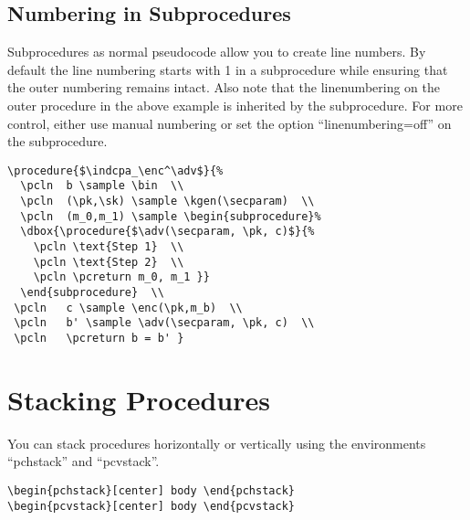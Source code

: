 \documentclass[a4paper]{report}
\begin{document}
\subsection{Numbering in Subprocedures}
Subprocedures as normal pseudocode allow you to create line numbers. By default the line numbering starts with 1 in a subprocedure while
ensuring that the outer numbering remains intact. Also note that the linenumbering on the outer procedure in the above example is inherited
by the subprocedure. For more control, either use manual numbering or set the option \enquote{linenumbering=off} on the subprocedure.

\begin{center}
 \end{center}
  \begin{lstlisting}
\procedure{$\indcpa_\enc^\adv$}{%
  \pcln  b \sample \bin  \\
  \pcln  (\pk,\sk) \sample \kgen(\secparam)  \\
  \pcln  (m_0,m_1) \sample \begin{subprocedure}%
  \dbox{\procedure{$\adv(\secparam, \pk, c)$}{%
  	\pcln \text{Step 1}  \\
  	\pcln \text{Step 2}  \\
	\pcln \pcreturn m_0, m_1 }}
  \end{subprocedure}  \\
 \pcln   c \sample \enc(\pk,m_b)  \\
 \pcln   b' \sample \adv(\secparam, \pk, c)  \\
 \pcln   \pcreturn b = b' }
\end{lstlisting}


\section{Stacking Procedures}
You can stack procedures horizontally or vertically using the environments \enquote{pchstack} and \enquote{pcvstack}.
\begin{lstlisting}
\begin{pchstack}[center] body \end{pchstack}
\begin{pcvstack}[center] body \end{pcvstack}
\end{lstlisting}
\end{document}
